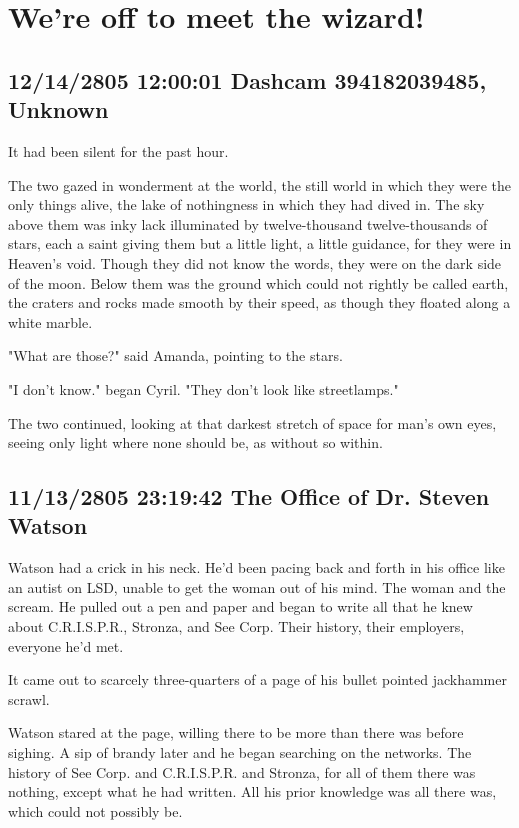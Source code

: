 \documentclass[12pt]{article}
\begin{document}
\section*{We're off to meet the wizard!}
\label{sec:orgab7741a}
\subsection*{12/14/2805 12:00:01 Dashcam 394182039485, Unknown}
\label{sec:org0ac59de}
It had been silent for the past hour.

The two gazed in wonderment at the world, the still world in which they were the only things alive, the lake of nothingness in which they had dived in. The sky above them was inky lack illuminated by twelve-thousand twelve-thousands of stars, each a saint giving them but a little light, a little guidance, for they were in Heaven's void. Though they did not know the words, they were on the dark side of the moon. Below them was the ground which could not rightly be called earth, the craters and rocks made smooth by their speed, as though they floated along a white marble.

"What are those?" said Amanda, pointing to the stars.

"I don't know." began Cyril. "They don't look like streetlamps."

The two continued, looking at that darkest stretch of space for man's own eyes, seeing only light where none should be, as without so within.

\subsection*{11/13/2805 23:19:42 The Office of Dr. Steven Watson}
\label{sec:orge0269a8}

Watson had a crick in his neck. He'd been pacing back and forth in his office like an autist on LSD, unable to get the woman out of his mind. The woman and the scream. He pulled out a pen and paper and began to write all that he knew about C.R.I.S.P.R., Stronza, and See Corp. Their history, their employers, everyone he'd met.

It came out to scarcely three-quarters of a page of his bullet pointed jackhammer scrawl. 

Watson stared at the page, willing there to be more than there was before sighing. A sip of brandy later and he began searching on the networks. The history of See Corp. and C.R.I.S.P.R. and Stronza, for all of them there was nothing, except what he had written. All his prior knowledge was all there was, which could not possibly be.
\end{document}
